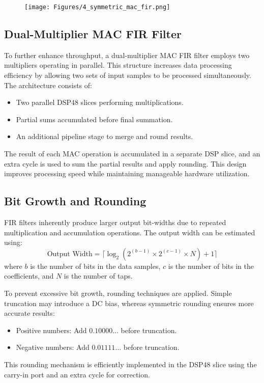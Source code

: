 \documentclass{article}
\begin{document}
	\begin{figure}
		\centering
		\texttt{[image: Figures/4\_symmetric\_mac\_fir.png]}
		\label{fig:enter-label}
	\end{figure}
	
	\subsection{Dual-Multiplier MAC FIR Filter}
	To further enhance throughput, a dual-multiplier MAC FIR filter employs two multipliers operating in parallel. This structure increases data processing efficiency by allowing two sets of input samples to be processed simultaneously. The architecture consists of:
	\begin{itemize}
		\item Two parallel DSP48 slices performing multiplications.
		\item Partial sums accumulated before final summation.
		\item An additional pipeline stage to merge and round results.
	\end{itemize}
	The result of each MAC operation is accumulated in a separate DSP slice, and an extra cycle is used to sum the partial results and apply rounding. This design improves processing speed while maintaining manageable hardware utilization.
	
	\subsection{Bit Growth and Rounding}
	FIR filters inherently produce larger output bit-widths due to repeated multiplication and accumulation operations. The output width can be estimated using:
	\begin{equation}
		\text{Output Width} = \lceil \log_2 (2^{(b-1)} \times 2^{(c-1)} \times N) + 1 \rceil
	\end{equation}
	where \( b \) is the number of bits in the data samples, \( c \) is the number of bits in the coefficients, and \( N \) is the number of taps.
	
	To prevent excessive bit growth, rounding techniques are applied. Simple truncation may introduce a DC bias, whereas symmetric rounding ensures more accurate results:
	\begin{itemize}
		\item Positive numbers: Add \( 0.10000\ldots \) before truncation.
		\item Negative numbers: Add \( 0.01111\ldots \) before truncation.
	\end{itemize}
	This rounding mechanism is efficiently implemented in the DSP48 slice using the carry-in port and an extra cycle for correction.
	
\end{document}
